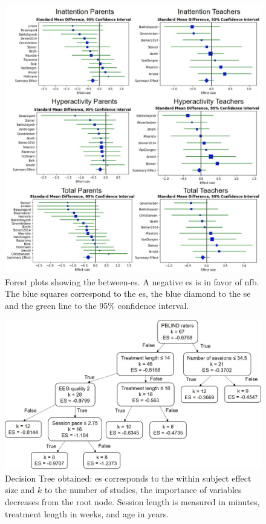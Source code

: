\begin{figure}[h!]
  \centering
  \includegraphics[width=1.0\linewidth]{figures/meta_review_forest_plots_update_meta_analysis_our_choices_no_colors_2-columns_fitting_image.jpg}
  \caption{Forest plots showing the between-\gls{es}. A negative \gls{es} is in favor of \gls{nfb}. 
	The blue squares correspond to the \gls{es}, the blue diamond to the \gls{se} and the green line to the 95\% confidence interval.}
  \label{Figure:meta_review_forest_plots_update_meta_analysis_our_choices_no_colors_2-columns_fitting_image}
\end{figure}

\begin{figure}[h!]
  \centering
  \includegraphics[width=1.0\linewidth]{figures/factors_analysis_decision_tree_results_no_colors_2-columns_fitting_image.jpg}
  \caption{Decision Tree obtained: \gls{es} corresponds to the within subject effect size and $k$ to the number of studies, 
  the importance of variables decreases from the root node. Session length is measured in minutes, treatment length in weeks, and age in years.}
  \label{Figure:factors_analysis_decision_tree_results}
\end{figure}


